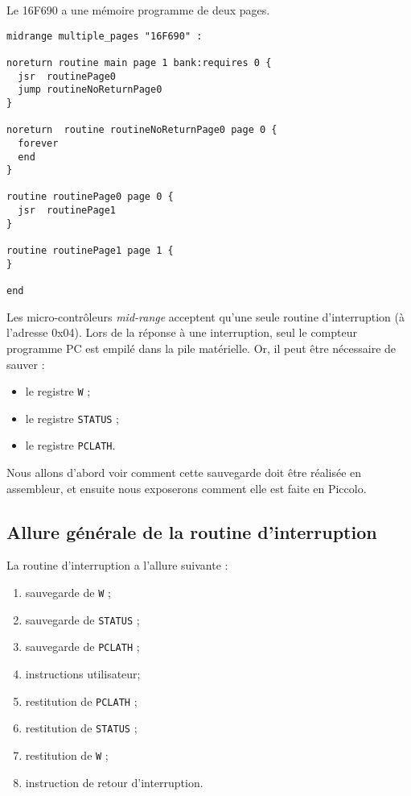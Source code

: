 Le 16F690 a une mémoire programme de deux pages. 

\begin{lstlisting}[language=piccolo]
midrange multiple_pages "16F690" :

noreturn routine main page 1 bank:requires 0 {
  jsr  routinePage0
  jump routineNoReturnPage0
}

noreturn  routine routineNoReturnPage0 page 0 {
  forever
  end
}

routine routinePage0 page 0 {
  jsr  routinePage1
}

routine routinePage1 page 1 {
}

end
\end{lstlisting}














Les micro-contrôleurs \emph{mid-range} acceptent qu’une seule routine d’interruption (à l’adresse 0x04). Lors de la réponse à une interruption, seul le compteur programme PC est empilé dans la pile matérielle. Or, il peut être nécessaire de sauver :
\begin{itemize}
  \item le registre \texttt{W} ;
  \item le registre \texttt{STATUS} ;
  \item le registre \texttt{PCLATH}.
\end{itemize}

Nous allons d'abord voir comment cette sauvegarde doit être réalisée en assembleur, et ensuite nous exposerons comment elle est faite en Piccolo.

\subsection{Allure générale de la routine d'interruption}

La routine d'interruption a l'allure suivante :
\begin{enumerate}
  \item sauvegarde de \texttt{W} ;
  \item sauvegarde de \texttt{STATUS} ;
  \item sauvegarde de \texttt{PCLATH} ;
  \item instructions utilisateur;
  \item restitution de \texttt{PCLATH} ;
  \item restitution de \texttt{STATUS} ;
  \item restitution de \texttt{W} ;
  \item instruction de retour d'interruption.
\end{enumerate}


